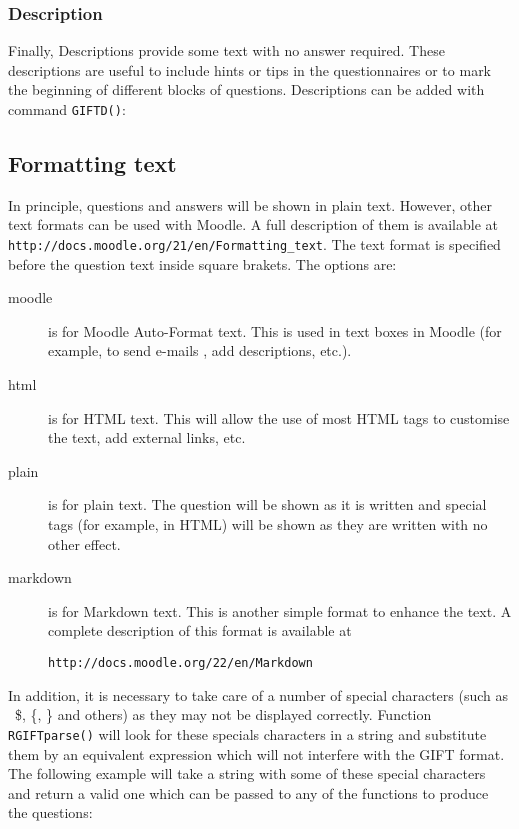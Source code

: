 \documentclass[a4paper]{article}
\newcommand{\code}[1]{\texttt{#1}}
\begin{document}



\subsubsection{Description}

Finally, Descriptions provide some text with no answer required. These
descriptions are useful to include hints or tips in the questionnaires
or to mark the beginning of different blocks of questions. Descriptions
can be added with command \code{GIFTD()}:



\subsection{Formatting text}

In principle, questions and answers will be shown in plain text.
However, other text formats can be used with Moodle.
A full description of them is available at 
\verb+http://docs.moodle.org/21/en/Formatting_text+.
The text format is specified before the question text inside square
brakets. The options are:

\begin{description}

\item[moodle] is for Moodle Auto-Format text. This is used in 
text boxes in Moodle (for example, to send e-mails , add descriptions, etc.).

\item[html] is for HTML text. This will allow the use of most HTML tags to
customise the text, add external links, etc.

\item[plain] is for plain text. The question will be shown as it is written
and special tags (for example, in HTML) will be shown as they are written with
no other effect.

\item[markdown] is for Markdown text. This is another simple format to enhance
the text. A complete description of this format is available at 

\verb+http://docs.moodle.org/22/en/Markdown+

\end{description}


In addition, it is necessary to take care of a number of special
characters (such as \, \$, \{, \} and others) as they may not be displayed
correctly. Function \code{RGIFTparse()}
will look for these specials characters in a string and substitute them
by an equivalent expression which will not interfere with the GIFT format.
The following example will take a string with some of these special
characters and return a valid one which can be passed to any of the
functions to produce the questions:
\end{document}
